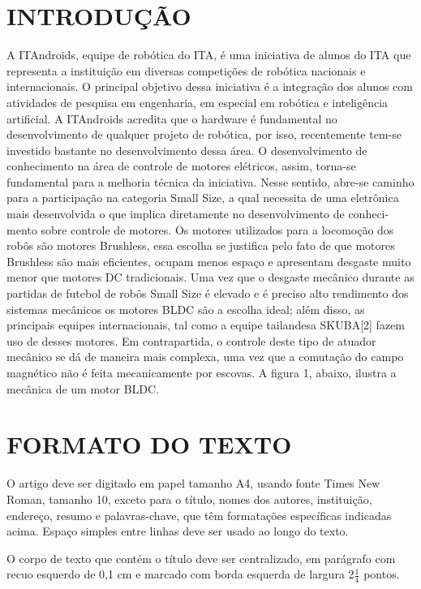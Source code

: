 \documentclass[10pt,fleqn,a4paper]{article}
\begin{document}
    \section{INTRODUÇÃO}
    A ITAndroids, equipe de robótica do ITA, é uma iniciativa de alunos do ITA que representa a
    instituição em diversas competições de robótica nacionais e internacionais. O principal objetivo
    dessa iniciativa é a integração dos alunos com atividades de pesquisa em engenharia, em especial
    em robótica e inteligência artificial.
    A ITAndroids acredita que o hardware é fundamental no desenvolvimento de qualquer projeto
    de robótica, por isso, recentemente tem-se investido bastante no desenvolvimento dessa área.
    O desenvolvimento de conhecimento na área de controle de motores elétricos, assim, torna-se
    fundamental para a melhoria técnica da iniciativa.
    Nesse sentido, abre-se caminho para a participação na categoria Small Size, a qual necessita
    de uma eletrônica mais desenvolvida o que implica diretamente no desenvolvimento de conheci-
    mento sobre controle de motores. Os motores utilizados para a locomoção dos robôs são motores
    Brushless, essa escolha se justifica pelo fato de que motores Brushless são mais eficientes, ocupam
    menos espaço e apresentam desgaste muito menor que motores DC tradicionais.
    Uma vez que o desgaste mecânico durante as partidas de futebol de robôs Small Size é elevado
    e é preciso alto rendimento dos sistemas mecânicos os motores BLDC são a escolha ideal; além
    disso, as principais equipes internacionais, tal como a equipe tailandesa SKUBA[2] fazem uso de
    desses motores. Em contrapartida, o controle deste tipo de atuador mecânico se dá de maneira
    mais complexa, uma vez que a comutação do campo magnético não é feita mecanicamente por
    escovas. A figura 1, abaixo, ilustra a mecânica de um motor BLDC.

    \section{FORMATO DO TEXTO}
        
        O artigo deve ser digitado em papel tamanho A4, usando fonte Times New Roman, tamanho 10, exceto para o título, nomes dos autores, instituição, endereço, resumo e palavras-chave, que têm formatações específicas indicadas acima. Espaço simples entre linhas deve ser usado ao longo do texto.

        O corpo de texto que contém o título deve ser centralizado, em parágrafo com recuo esquerdo de 0,1 cm e marcado com borda esquerda de largura 2$\frac{1}{4}$ pontos.
\end{document}
